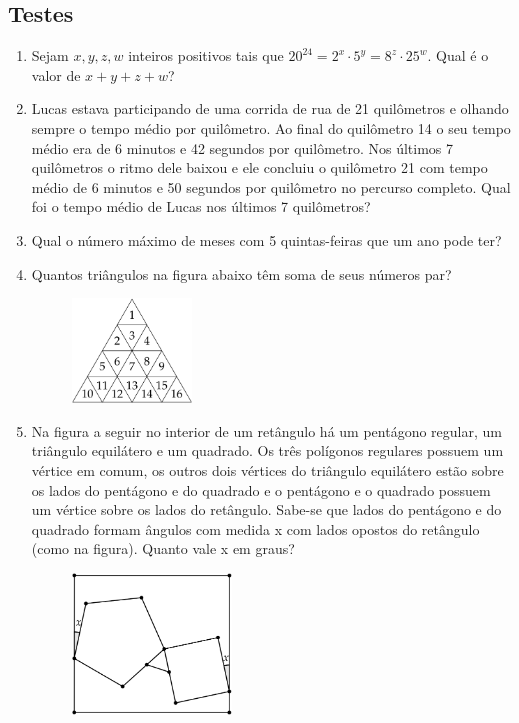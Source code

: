 \documentclass[12pt]{article}
\begin{document}
    \subsection{Testes}
      \begin{enumerate}[label=\textbf{\arabic*.}]
        \item Sejam \(x, y, z, w\) inteiros positivos tais que \(20^{24} = 2^x \cdot 5^y = 8^z \cdot 25^w\). Qual é o valor de \(x + y + z + w\)?
        \item Lucas estava participando de uma corrida de rua de 21 quilômetros e olhando sempre o tempo médio por quilômetro. Ao final do
          quilômetro 14 o seu tempo médio era de 6 minutos e 42 segundos por quilômetro. Nos últimos 7 quilômetros o ritmo dele baixou e ele
          concluiu o quilômetro 21 com tempo médio de 6 minutos e 50 segundos por quilômetro no percurso completo. Qual foi o tempo médio de
          Lucas nos últimos 7 quilômetros?
        \item Qual o número máximo de meses com 5 quintas-feiras que um ano pode ter?
        \item Quantos triângulos na figura abaixo têm soma de seus números par?
          \begin{figure}[h]
            \centering
            \includegraphics[width=0.3\textwidth]{first.png}
          \end{figure}
        \item Na figura a seguir no interior de um retângulo há um pentágono regular, um triângulo equilátero e um
quadrado. Os três polígonos regulares possuem um vértice em comum, os outros dois vértices do triângulo
equilátero estão sobre os lados do pentágono e do quadrado e o pentágono e o quadrado possuem um vértice
sobre os lados do retângulo. Sabe-se que lados do pentágono e do quadrado formam ângulos com medida x
com lados opostos do retângulo (como na figura). Quanto vale x em graus? 
          \begin{figure}[h]
            \centering
            \includegraphics[width=0.4\textwidth]{second.png}
          \end{figure}


\end{enumerate}
\end{document}
